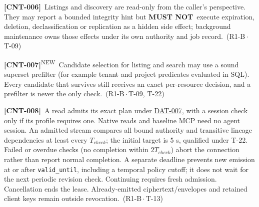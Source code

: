 \documentclass[11pt,a4paper]{article}
\newcommand{\mustnot}{\textbf{MUST NOT}}
\newcommand{\code}[1]{{\small\nolinkurl{#1}}}
\newcommand{\rr}[1]{\hyperlink{req:#1}{#1}}
\newcommand{\reqtag}[2]{{\footnotesize\color{accent}(#1\,$\cdot$\,#2)}}
\newcommand{\req}[4]{\par\noindent\hypertarget{req:#1}{\textbf{[#1]}}\ #4\ \reqtag{#2}{#3}\par}
\newcommand{\reqn}[4]{\par\noindent\hypertarget{req:#1}{\textbf{[#1]}}\textsuperscript{\color{accent}\tiny NEW}\ #4\ \reqtag{#2}{#3}\par}
\begin{document}
\req{CNT-006}{R1-B}{T-09}{Listings and discovery are read-only from the caller's perspective. They may report a bounded integrity hint but \mustnot\ execute expiration, deletion, declassification or replication as a hidden side effect; background maintenance owns those effects under its own authority and job record.}
\reqn{CNT-007}{R1-B}{T-09, T-22}{Candidate selection for listing and search may use a sound superset prefilter (for example tenant and project predicates evaluated in SQL). Every candidate that survives still receives an exact per-resource decision, and a prefilter is never the only check.}
\req{CNT-008}{R1-B}{T-13}{A read admits its exact plan under \rr{DAT-007}, with a session check only if its profile requires one. Native reads and baseline MCP need no agent session. An admitted stream compares all bound authority and transitive lineage dependencies at least every $T_{check}$; the initial target is 5 s, qualified under T-22. Failed or overdue checks (no completion within $2T_{check}$) abort the connection rather than report normal completion. A separate deadline prevents new emission at or after \code{valid_until}, including a temporal policy cutoff; it does not wait for the next periodic revision check. Continuing requires fresh admission. Cancellation ends the lease. Already-emitted ciphertext/envelopes and retained client keys remain outside revocation.}
\end{document}
